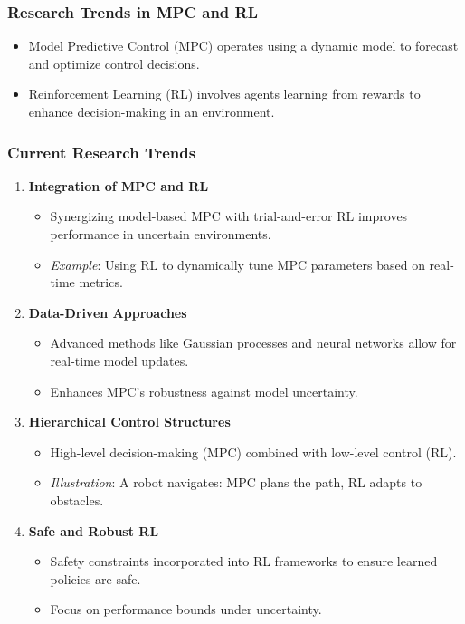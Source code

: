 \documentclass[aspectratio=169]{beamer}
\begin{document}
\begin{frame}[fragile]
    \frametitle{Research Trends in MPC and RL}
    \begin{itemize}
        \item Model Predictive Control (MPC) operates using a dynamic model to forecast and optimize control decisions.
        \item Reinforcement Learning (RL) involves agents learning from rewards to enhance decision-making in an environment.
    \end{itemize}
\end{frame}

\begin{frame}[fragile]
    \frametitle{Current Research Trends}
    \begin{enumerate}
        \item \textbf{Integration of MPC and RL}
            \begin{itemize}
                \item Synergizing model-based MPC with trial-and-error RL improves performance in uncertain environments.
                \item \textit{Example}: Using RL to dynamically tune MPC parameters based on real-time metrics.
            \end{itemize}
        
        \item \textbf{Data-Driven Approaches}
            \begin{itemize}
                \item Advanced methods like Gaussian processes and neural networks allow for real-time model updates.
                \item Enhances MPC's robustness against model uncertainty.
            \end{itemize}
        
        \item \textbf{Hierarchical Control Structures}
            \begin{itemize}
                \item High-level decision-making (MPC) combined with low-level control (RL).
                \item \textit{Illustration}: A robot navigates: MPC plans the path, RL adapts to obstacles.
            \end{itemize}
        
        \item \textbf{Safe and Robust RL}
            \begin{itemize}
                \item Safety constraints incorporated into RL frameworks to ensure learned policies are safe.
                \item Focus on performance bounds under uncertainty.
            \end{itemize}
    \end{enumerate}
\end{frame}
\end{document}
